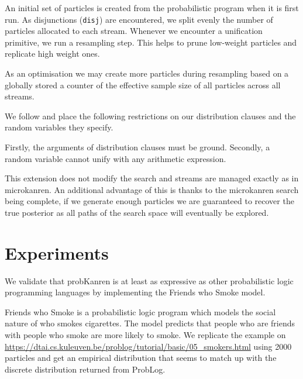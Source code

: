 \documentclass[
]{ceurart}
\begin{document}
An initial set of particles is created from the probabilistic program
when it is first run. As disjunctions (\texttt{disj}) are encountered,
we split evenly the number of particles allocated to each stream. Whenever
we encounter a unification primitive, we run a resampling step. This
helps to prune low-weight particles and replicate high weight ones.

As an optimisation we may create more particles during resampling
based on a globally stored a counter of the effective sample size of
all particles across all streams.

We follow \cite{gutmann2010extending} and place the following restrictions
on our distribution clauses and the random variables they specify.

Firstly, the arguments of distribution clauses must be
ground. Secondly, a random variable cannot unify with any arithmetic
expression.

This extension does not modify the search and streams are managed
exactly as in microkanren. An additional advantage of this is thanks
to the microkanren search being complete, if we generate enough
particles we are guaranteed to recover the true posterior as all paths
of the search space will eventually be explored.


\section{Experiments}

We validate that probKanren is at least as expressive as other probabilistic
logic programming languages by implementing the Friends who Smoke model.

Friends who Smoke is a probabilistic logic program which models the
social nature of who smokes cigarettes. The model predicts that people
who are friends with people who smoke are more likely to smoke. We
replicate the example on
\url{https://dtai.cs.kuleuven.be/problog/tutorial/basic/05_smokers.html}
using 2000 particles and get an empirical distribution that seems to
match up with the discrete distribution returned from ProbLog.



\end{document}
